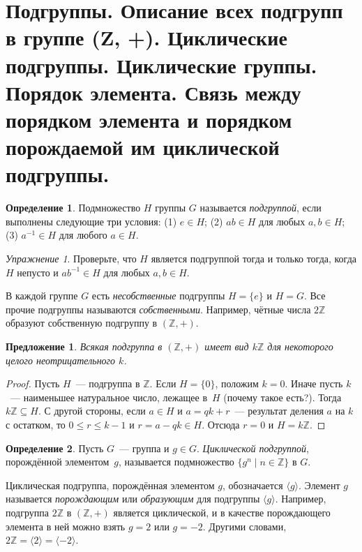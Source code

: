 \documentclass[a4paper, 12pt]{article}
\def\ZZ{{\mathbb Z}}%
\newtheorem{proposition}{Предложение}
\theoremstyle{definition}
\newtheorem{definition}{Определение}
\theoremstyle{remark}
\newtheorem{exc}{Упражнение}
\begin{document}
\section{Подгруппы. Описание всех подгрупп в группе (Z, +). Циклические подгруппы. Циклические группы. Порядок элемента. Связь между порядком элемента и порядком порождаемой им циклической подгруппы.}

\begin{definition}
Подмножество $H$ группы $G$ называется {\it подгруппой}, если выполнены следующие три условия: (1) $e \in H$; \quad (2) $ab\in H$ для любых $a,b
\in H$; \quad (3) $a^{-1}\in H$ для любого
$a\in H$.
\end{definition}

\begin{exc}
Проверьте, что $H$ является подгруппой тогда и только тогда, когда
 $H$ непусто и $ab^{-1}\in H$ для любых $a,b\in H$.
\end{exc}

В каждой группе $G$ есть {\it несобственные} подгруппы $H=\{e\}$ и
$H=G$. 
Все прочие подгруппы называются {\it собственными}. 
Например,
чётные числа $2\ZZ$ образуют собственную подгруппу в $(\ZZ,+)$.

\begin{proposition} \label{sbgrz}
Всякая подгруппа в $(\ZZ,+)$ имеет вид $k\ZZ$ для некоторого целого
неотрицательного $k$.
\end{proposition}

\begin{proof}
Пусть $H$~--- подгруппа в $\ZZ$. Если $H=\{0\}$, положим $k=0$.
Иначе пусть $k$~--- наименьшее натуральное число, лежащее в~$H$
(почему такое есть?). 
Тогда $k\ZZ \subseteq H$. С другой стороны,
если $a\in H$ и $a=qk+r$~--- результат деления $a$ на $k$ с
остатком, то $0 \leqslant r \leqslant k-1$ и $r = a - qk \in H$.
Отсюда $r=0$ и $H=k\ZZ$.
\end{proof}

\begin{definition}
Пусть $G$~--- группа и $g\in G$. {\it Циклической подгруппой},
порождённой элементом~$g$, называется подмножество $\{g^n \mid
n\in\ZZ\}$ в $G$.
\end{definition}

Циклическая подгруппа, порождённая элементом $g$, обозначается
$\langle g\rangle$. 
Элемент $g$ называется {\it порождающим} или
{\it образующим} для подгруппы $\langle g\rangle$. 
Например,
подгруппа $2\ZZ$ в $(\ZZ,+)$ является циклической, и в качестве
порождающего элемента в ней можно взять $g=2$ или $g=-2$. 
Другими
словами, $2\ZZ=\langle 2\rangle=\langle -2\rangle$.
\end{document}
